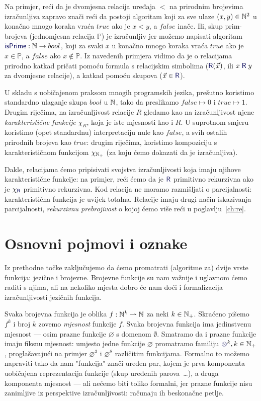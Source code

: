 Na primjer, reći da je dvomjesna relacija uređaja $<$ na prirodnim brojevima iz\-ra\-čun\-lji\-va zapravo znači reći da postoji algoritam koji za sve ulaze $(x,y)\in{\mathbb N}^2$ u konačno mnogo koraka vraća $\mathit{true}$ ako je $x<y$, a $\mathit{false}$ inače. Ili, skup prim-brojeva (jednomjesna relacija $\mathbb P$) je izračunljiv jer možemo napisati algoritam $\f{isPrime}:\N\to bool$, koji za svaki $x$ u konačno mnogo koraka vraća $\mathit{true}$ ako je $x\in\mathbb P$, a $\mathit{false}$ ako $x\notin\mathbb P$. Iz navedenih primjera vidimo da je o relacijama prirodno katkad pričati pomoću formula s relacijskim simbolima ($\f{R}(\vec x)$, ili $x\mathrel{\f R}y$ za dvomjesne relacije), a katkad pomoću skupova ($\vec x\in\f{R}$).

U skladu s uobičajenom praksom mnogih programskih jezika, prešutno koristimo standardno ulaganje skupa $bool$ u ${\mathbb N}$, tako da preslikamo $\mathit{false}\mapsto 0$ i $\mathit{true}\mapsto 1$. Drugim riječima, na izračunljivost relacije $R$ gledamo kao na izračunljivost njene \emph{karakteristične funkcije} $\chi_R$, koja je iste mjesnosti kao i $R$. U suprotnom smjeru koristimo (opet standardnu) interpretaciju nule kao $\mathit{false}$, a svih ostalih prirodnih brojeva kao $\mathit{true}$: drugim riječima, koristimo kompoziciju s karakterističnom funkcijom $\chi_{{\mathbb N}_+}$ (za koju ćemo dokazati da je izračunljiva).

Dakle, relacijama ćemo pripisivati svojstva izračunljivosti koja imaju njihove karakteristične funkcije: na primjer, reći ćemo da je $\f{R}$ primitivno rekurzivna ako je $\chi_{\f{R}}$ primitivno rekurzivna. Kod relacija ne moramo razmišljati o parcijalnosti: karakteristična funkcija je uvijek totalna. Relacije imaju drugi način iskazivanja parcijalnosti, \emph{rekurzivnu prebrojivost} o kojoj ćemo više reći u poglavlju~\ref{ch:re}.

\section{Osnovni pojmovi i oznake}

Iz prethodne točke zaključujemo da ćemo promatrati (algoritme za) dvije vrste funkcija: jezične i brojevne. Brojevne funkcije su nam važnije i uglavnom ćemo raditi s njima, ali na nekoliko mjesta dobro će nam doći i formalizacija izračunljivosti jezičnih funkcija.

Svaka brojevna funkcija je oblika $f:{\mathbb N}^k\rightharpoonup{\mathbb N}$ za neki $k\in{\mathbb N}_+$. Skraćeno pišemo $f^k$ i broj $k$ zovemo \emph{mjesnost} funkcije $f$. Svaka brojevna funkcija ima jedinstvenu mjesnost --- osim prazne funkcije $\varnothing$ s domenom $\emptyset$. Smatramo da i prazne funkcije imaju fiksnu mjesnost: umjesto jedne funkcije $\varnothing$ promatramo familiju $\varnothing^k,k\in\N_+$, proglašavajući na primjer $\varnothing^3$ i $\varnothing^8$ različitim funkcijama. Formalno to možemo napraviti tako da nam "funkcija" znači uređen par, kojem je prva komponenta uobičajena reprezentacija funkcije (skup uređenih parova~\ldots), a druga komponenta mjesnost --- ali nećemo biti toliko formalni, jer prazne funkcije nisu zanimljive iz perspektive izračunljivosti: računaju ih beskonačne petlje.

